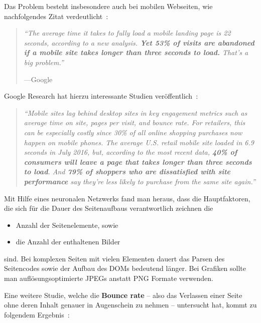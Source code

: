 \documentclass[a4paper, justified, notoc]{tufte-handout} %
\begin{document}
Das Problem besteht insbesondere auch bei mobilen Webseiten, wie nachfolgendes Zitat verdeutlicht~\citep{hobo:2018}:
\begin{quote}
	\emph{``The average time it takes to fully load a mobile landing page is 22 seconds, according to a new analysis. \textbf{Yet 53\% of visits are abandoned if a mobile site takes longer than three seconds to load.} That’s a big problem.''}\begin{flushright}\vspace{-1em}---Google \end{flushright}
\end{quote}

Google Research hat hierzu interessante Studien veröffentlich~\citep{an:2016}:
\begin{quote}
	\emph{``Mobile sites lag behind desktop sites in key engagement metrics such as average time on site, pages per visit, and bounce rate. For retailers, this can be especially costly since 30\% of all online shopping purchases now happen on mobile phones. The average U.S. retail mobile site loaded in 6.9 seconds in July 2016, but, according to the most recent data, \textbf{40\% of consumers will leave a page that takes longer than three seconds to load}. And \textbf{79\% of shoppers who are dissatisfied with site performance} say they're less likely to purchase from the same site again.''}
\end{quote}

Mit Hilfe eines neuronalen Netzwerks fand man heraus, dass die Hauptfaktoren, die sich für die Dauer des Seitenaufbaus verantwortlich zeichnen die \begin{itemize}
	\item Anzahl der Seitenelemente, sowie
	\item die Anzahl der enthaltenen Bilder
\end{itemize} sind. Bei komplexen Seiten mit vielen Elementen dauert das Parsen des Seitencodes sowie der Aufbau des DOMs bedeutend länger. Bei Grafiken sollte man auflösungsoptimierte JPEGs anstatt PNG Formate verwenden.

Eine weitere Studie, welche die \textbf{Bounce rate} -- also das Verlassen einer Seite ohne deren Inhalt genauer in Augenschein zu nehmen -- untersucht hat, kommt zu folgendem Ergebnis~\citep{google:2017}:
\end{document}
